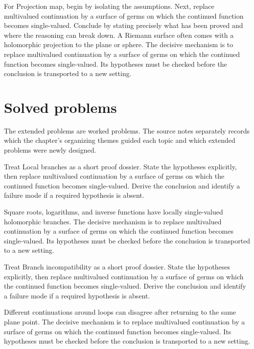 \begin{example}\label{ex:iv22-worked-04}
For Projection map, begin by isolating the assumptions. Next, replace multivalued continuation by a surface of germs on which the continued function becomes single-valued. Conclude by stating precisely what has been proved and where the reasoning can break down. A Riemann surface often comes with a holomorphic projection to the plane or sphere. The decisive mechanism is to replace multivalued continuation by a surface of germs on which the continued function becomes single-valued. Its hypotheses must be checked before the conclusion is transported to a new setting.
\end{example}

\section{Solved problems}
The extended problems are worked problems. The source notes separately records which the chapter's organizing themes guided each topic and which extended problems were newly designed.

\begin{problem}\label{prob:iv22-problem-01}
Treat Local branches as a short proof dossier. State the hypotheses explicitly, then replace multivalued continuation by a surface of germs on which the continued function becomes single-valued. Derive the conclusion and identify a failure mode if a required hypothesis is absent.
\end{problem}
\begin{solution}
Square roots, logarithms, and inverse functions have locally single-valued holomorphic branches. The decisive mechanism is to replace multivalued continuation by a surface of germs on which the continued function becomes single-valued. Its hypotheses must be checked before the conclusion is transported to a new setting.
\end{solution}

\begin{problem}\label{prob:iv22-problem-02}
Treat Branch incompatibility as a short proof dossier. State the hypotheses explicitly, then replace multivalued continuation by a surface of germs on which the continued function becomes single-valued. Derive the conclusion and identify a failure mode if a required hypothesis is absent.
\end{problem}
\begin{solution}
Different continuations around loops can disagree after returning to the same plane point. The decisive mechanism is to replace multivalued continuation by a surface of germs on which the continued function becomes single-valued. Its hypotheses must be checked before the conclusion is transported to a new setting.
\end{solution}


